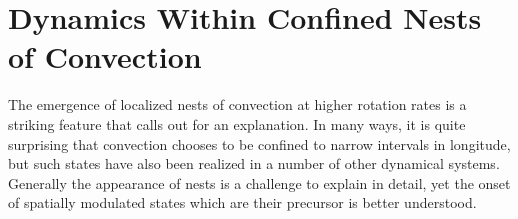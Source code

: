 %
%
%
%
%
%


\chapter{Dynamics Within Confined Nests of Convection}
\label{chapter:active nests of convection}
The emergence of localized nests of convection at higher rotation
rates is a striking feature that calls out for an explanation.  In
many ways, it is quite surprising that convection chooses to be
confined to narrow intervals in longitude, but such states have also
been realized in a number of other dynamical systems.  Generally the
appearance of nests is a challenge to explain in detail, yet the onset
of spatially modulated states which are their precursor is better
understood. 

\label{sec:patches}
